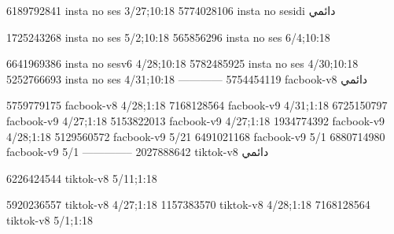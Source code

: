 
6189792841 insta no ses
3/27;10:18
5774028106 insta no sesidi
دائمي


1725243268 insta no ses
5/2;10:18
565856296 insta no ses
6/4;10:18

6641969386 insta no sesv6
4/28;10:18
5782485925 insta no ses
4/30;10:18
5252766693 insta no ses
4/31;10:18
------------
5754454119 facbook-v8
دائمي

5759779175 facbook-v8
4/28;1:18
7168128564 facbook-v9
4/31;1:18
6725150797 facbook-v9
4/27;1:18
5153822013 facbook-v9
4/27;1:18
1934774392 facbook-v9
4/28;1:18
5129560572 facbook-v9
5/21
6491021168 facbook-v9
5/1
6880714980 facbook-v9
5/1
--------------
2027888642 tiktok-v8
دائمي

6226424544 tiktok-v8
5/11;1:18

5920236557 tiktok-v8
4/27;1:18
1157383570 tiktok-v8
4/28;1:18
7168128564 tiktok-v8
5/1;1:18
